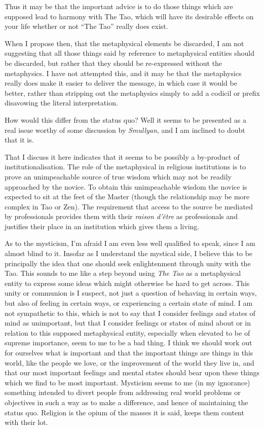 \documentclass[numreferences]{rbjk}
\begin{document}
\begin{article}
Thus it may be that the important advice is to do those things which are supposed lead to harmony with The Tao, which will have its desirable effects on your life whether or not ``The Tao'' really does exist.

When I propose then, that the metaphysical elements be discarded, I am not suggesting that all those things said by reference to metaphysical entities should be discarded, but rather that they should be re-expressed without the metaphysics.
I have not attempted this, and it may be that the metaphysics really does make it easier to deliver the message, in which case it would be better, rather than stripping out the metaphysics simply to add a codicil or prefix disavowing the literal interpretation.

How would this differ from the status quo?
Well it seems to be presented as a real issue worthy of some discussion by {\it Smullyan}, and I am inclined to doubt that it is.

That I discuss it here indicates that it seems to be possibly a by-product of institutionalisation.
The role of the metaphysical in religious institutions is to prove an unimpeachable source of true wisdom which may not be readily approached by the novice.
To obtain this unimpeachable wisdom the novice is expected to sit at the feet of the Master (though the relationship may be more complex in Tao or Zen).
The requirement that access to the source be mediated by professionals provides them with their {\it raison d'\^{e}tre} as professionals and justifies their place in an institution which gives them a living.

As to the mysticism, I'm afraid I am even less well qualified to speak, since I am almost blind to it.
Insofar as I understand the mystical side, I believe this to be principally the idea that one should seek enlightenment through unity with the Tao.
This sounds to me like a step beyond using {\it The Tao} as a metaphysical entity to express some ideas which might otherwise be hard to get across.
This unity or communion is I suspect, not just a question of behaving in certain ways, but also of feeling in certain ways, or experiencing a certain state of mind.
I am not sympathetic to this, which is not to say that I consider feelings and states of mind as unimportant, but that I consider feelings or states of mind about or in relation to this supposed metaphysical entity, especially when elevated to be of supreme importance, seem to me to be a bad thing.
I think we should work out for ourselves what is important and that the important things are things in this world, like the people we love, or the improvement of the world they live in, and that our most important feelings and mental states should bear upon these things which we find to be most important.
Mysticism seems to me (in my ignorance) something intended to divert people from addressing real world problems or objectives in such a way as to make a difference, and hence of maintaining the status quo.
Religion is the opium of the masses it is said, keeps them content with their lot.  


\end{article}
\end{document}
